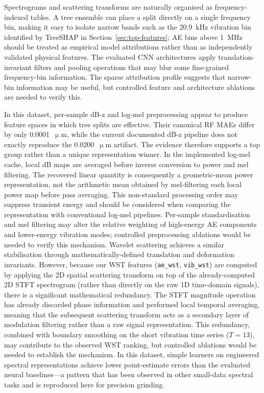 Spectrograms and scattering transforms are naturally organised as
frequency-indexed tables. A tree ensemble can place a split directly on a
single frequency bin, making it easy to isolate narrow bands such as the
20.9~kHz vibration bin identified by TreeSHAP in
Section~\ref{sec:top-features}; AE bins above 1~MHz should be treated as
empirical model attributions rather than as independently validated
physical features. The evaluated CNN architectures apply translation-invariant filters
and pooling operations that may blur some fine-grained frequency-bin
information. The sparse attribution profile suggests that narrow-bin
information may be useful, but controlled feature and architecture
ablations are needed to verify this.

In this dataset, per-sample dB-z and log-mel preprocessing appear to produce feature spaces in which tree splits are effective. Their canonical RF MAEs differ by only 0.0001~\(\upmu\)m, while the current documented dB-z pipeline does not exactly reproduce the 0.0200~\(\upmu\)m artifact. The evidence therefore supports a top group rather than a unique representation winner. In the implemented log-mel cache, local dB maps are averaged before inverse conversion to power and mel filtering. The recovered linear quantity is consequently a geometric-mean power representation, not the arithmetic mean obtained by mel-filtering each local power map before pass averaging. This non-standard processing order may suppress transient energy and should be considered when comparing the representation with conventional log-mel pipelines. Per-sample standardisation and mel filtering may alter the relative weighting of high-energy AE components and lower-energy vibration modes; controlled preprocessing ablations would be needed to verify this mechanism.
Wavelet scattering achieves a similar stabilisation through
mathematically-defined translation and deformation invariants. However, because our WST features (\texttt{ae\_wst}, \texttt{vib\_wst}) are computed by applying the 2D spatial scattering transform on top of the already-computed 2D STFT spectrogram (rather than directly on the raw 1D time-domain signals), there is a significant mathematical redundancy. The STFT magnitude operation has already discarded phase information and performed local temporal averaging, meaning that the subsequent scattering transform acts as a secondary layer of modulation filtering rather than a raw signal representation. This redundancy, combined with boundary smoothing on the short vibration time series ($T=13$), may contribute to the observed WST ranking, but controlled ablations would be needed to establish the mechanism. In this dataset, simple learners on engineered spectral
representations achieve lower point-estimate errors than the evaluated
neural baselines---a pattern that has been observed in other small-data
spectral tasks and is reproduced here for precision grinding.

